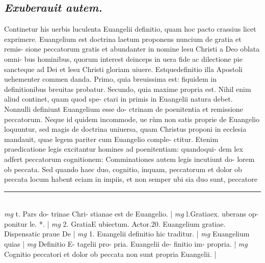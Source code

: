 \documentclass{article}
\begin{document}
\begin{pages}
\subsection*{\textit{Exuberauit autem. }}\pstart Continetur his uerbis luculenta Euangelii definitio, quam hoc pacto crassius licet exprimere. Euangelium est doctrina laetum proponens nuncium de gratia et remis- sione peccatorum gratis et abundanter in nomine lesu Christi a Deo oblata omni- bus hominibus, quorum interest deinceps in uera fide ac dilectione pie sancteque  ad Dei et lesu Christi gloriam uiuere. Estquedefinitio illa Apostoli uehementer commen danda. Primo, quia breuissima est: fiquidem in definitionibus breuitas probatur. Secundo, quia maxime propria est. Nihil enim aliud continet, quam quod spe- ctari in primis in Euangelii natura debet. Nonnulli definiunt Euangelium esse do- ctrinam de poenitentia et remissione peccatorum. Neque id quidem incommode, ue rùm non satis proprie de Euangelio loquuntur, sed magis de doctrina uniuersa, quam Christus proponi in ecclesia mandauit, quae legem pariter cum Euangelio comple- ctitur. Etenim praedicatione legis excitantur homines ad poenitentiam: quandoqui- dem lex adfert peccatorum cognitionem: Comminationes autem legis incutiunt do- lorem ob peccata. Sed quando haec duo, cognitio, inquam, peccatorum et dolor ob peccata locum habent eciam in impiis, et non semper ubi sia duo sunt, peccatore  \pend
\vspace{0.5cm}\noindent
\vspace{0.2cm}\rule{1cm}{0.2pt}\\ 
\hspace{0.2cm}\textit{mg}
\footnotesize t. Pars do- trinae Chri- stianae est de Euangelio. 
\normalsize| 
\hspace{0.2cm}\textit{mg}
\footnotesize l.Gratiaex. uberans op- ponitur le. *. 
\normalsize| 
\hspace{0.2cm}\textit{mg}
\footnotesize 2. GratiaE  ubiectum. Actor.20. Euangelium gratiae. Dispensatic praue De 
\normalsize| 
\hspace{0.2cm}\textit{mg}
\footnotesize 1. Euangelii definitio hic traditur. 
\normalsize| 
\hspace{0.2cm}\textit{mg}
\footnotesize Euangelium quias 
\normalsize| 
\hspace{0.2cm}\textit{mg}
\footnotesize Definitio E- tagelii pro- pria. Euangelii de- finitio im- propria. 
\normalsize| 
\hspace{0.2cm}\textit{mg}
\footnotesize Cognitio peccatori et dolor ob peccata non sunt propria Euangelii. 
\normalsize| 

\end{pages}
\end{document}

